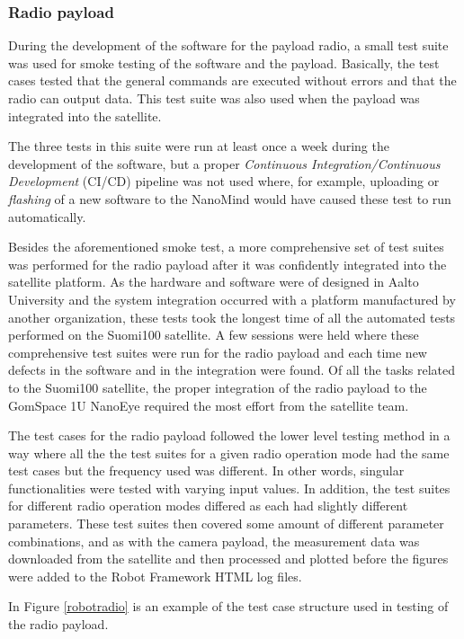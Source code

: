 \documentclass[english,12pt,a4paper,pdftex,elec,utf8]{aaltothesis}
\begin{document}
\subsubsection{Radio payload}
During the development of the software for the payload radio, a small test suite was used for smoke testing of the software and the payload. Basically, the test cases tested that the general commands are executed without errors and that the radio can output data. This test suite was also used when the payload was integrated into the satellite.\par
The three tests in this suite were run at least once a week during the development of the software, but a proper \textit{Continuous Integration/Continuous Development} (CI/CD) pipeline was not used where, for example, uploading or \textit{flashing} of a new software to the NanoMind would have caused these test to run automatically.\par
Besides the aforementioned smoke test, a more comprehensive set of test suites was performed for the radio payload after it was confidently integrated into the satellite platform. As the hardware and software were of designed in Aalto University and the system integration occurred with a platform manufactured by another organization, these tests took the longest time of all the automated tests performed on the Suomi100 satellite. A few sessions were held where these comprehensive test suites were run for the radio payload and each time new defects in the software and in the integration were found. Of all the tasks related to the Suomi100 satellite, the proper integration of the radio payload to the GomSpace 1U NanoEye required the most effort from the satellite team.\par
The test cases for the radio payload followed the lower level testing method in a way where all the the test suites for a given radio operation mode had the same test cases but the frequency used was different. In other words, singular functionalities were tested with varying input values. In addition, the test suites for different radio operation modes differed as each had slightly different parameters. These test suites then covered some amount of different parameter combinations, and as with the camera payload, the measurement data was downloaded from the satellite and then processed and plotted before the figures were added to the Robot Framework HTML log files.\par 
In Figure \ref{robotradio} is an example of the test case structure used in testing of the radio payload.\par 
\end{document}

